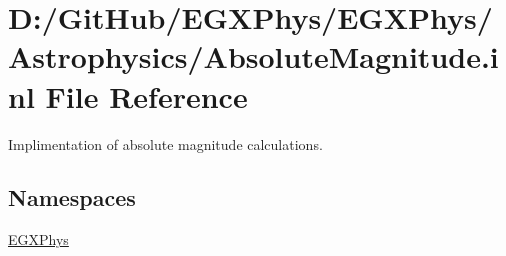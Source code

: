 \hypertarget{_absolute_magnitude_8inl}{}\section{D\+:/\+Git\+Hub/\+E\+G\+X\+Phys/\+E\+G\+X\+Phys/\+Astrophysics/\+Absolute\+Magnitude.inl File Reference}
\label{_absolute_magnitude_8inl}


Implimentation of absolute magnitude calculations.  


\subsection*{Namespaces}
\begin{DoxyCompactItemize}
\item 
 \mbox{\hyperlink{namespace_e_g_x_phys}{E\+G\+X\+Phys}}
\end{DoxyCompactItemize}
